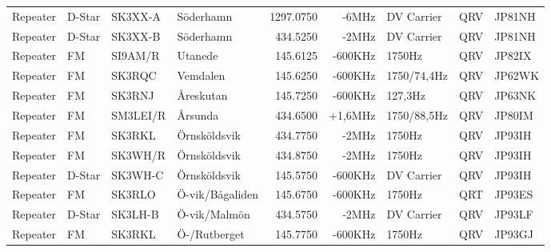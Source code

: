 \begin{landscape}
\begin{longtable}{llllrrlcl}
	Repeater                  & D-Star        & SK3XX-A       & Söderhamn           & 1297.0750         & -6MHz          & DV Carrier       & QRV             & JP81NH           \\
	Repeater                  & D-Star        & SK3XX-B       & Söderhamn           & 434.5250          & -2MHz          & DV Carrier       & QRV             & JP81NH           \\
	Repeater                  & FM            & SI9AM/R       & Utanede             & 145.6125          & -600KHz        & 1750Hz           & QRV             & JP82IX           \\
	Repeater                  & FM            & SK3RQC        & Vemdalen            & 145.6250          & -600KHz        & 1750/74,4Hz      & QRV             & JP62WK           \\
	Repeater                  & FM            & SK3RNJ        & Åreskutan           & 145.7250          & -600KHz        & 127,3Hz          & QRV             & JP63NK           \\
	Repeater                  & FM            & SM3LEI/R      & Årsunda             & 434.6500          & +1,6MHz        & 1750/88,5Hz      & QRV             & JP80IM           \\
	Repeater                  & FM            & SK3RKL        & Örnsköldsvik        & 434.7750          & -2MHz          & 1750Hz           & QRV             & JP93IH           \\
	Repeater                  & FM            & SK3WH/R       & Örnsköldsvik        & 434.8750          & -2MHz          & 1750Hz           & QRV             & JP93IH           \\
	Repeater                  & D-Star        & SK3WH-C       & Örnsköldsvik        & 145.5750          & -600KHz        & DV Carrier       & QRV             & JP93IH           \\
	Repeater                  & FM            & SK3RLO        & Ö-vik/Bågaliden     & 145.6750          & -600KHz        & 1750Hz           & QRT             & JP93ES           \\
	Repeater                  & D-Star        & SK3LH-B       & Ö-vik/Malmön        & 434.5750          & -2MHz          & DV Carrier       & QRV             & JP93LF           \\
	Repeater                  & FM            & SK3RKL        & Ö-/Rutberget        & 145.7750          & -600KHz        & 1750Hz           & QRV             & JP93GJ           \\

\end{longtable}
\end{landscape}

